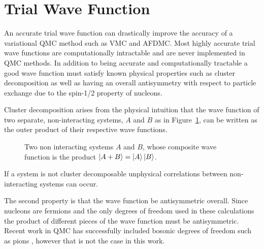 \section{Trial Wave Function}
An accurate trial wave function can drastically improve the accuracy of a variational QMC method such as VMC and AFDMC. Most highly accurate trial wave functions are computationally intractable and are never implemented in QMC methods. In addition to being accurate and computationally tractable a good wave function must satisfy known physical properties such as cluster decomposition as well as having an overall antisymmetry with respect to particle exchange due to the spin-1/2 property of nucleons.

Cluster decomposition arises from the physical intuition that the wave function of two separate, non-interacting systems, $A$ and $B$ as in Figure~\ref{fig:cluster}, can be written as the outer product of their respective wave functions.
\begin{figure}[h]
   \centering
   \caption{Two non interacting systems $A$ and $B$, whose composite wave function is the product $\left| A+B \right>=\left| A \right>\left| B \right>$.}
   \label{fig:cluster}
\end{figure}
If a system is not cluster decomposable unphysical correlations between non-interacting systems can occur.

The second property is that the wave function be antisymmetric overall. Since nucleons are fermions and the only degrees of freedom used in these calculations the product of different pieces of the wave function must be antisymmetric. Recent work in QMC has successfully included bosonic degrees of freedom such as pions \cite{madeira2018}, however that is not the case in this work.


